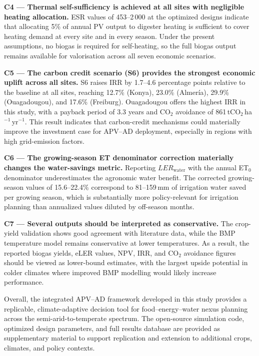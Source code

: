 \textbf{C4 --- Thermal self-sufficiency is achieved at all sites with negligible heating allocation.}
ESR values of 453--2\,000 at the optimized designs indicate that allocating 5\% of annual PV output to digester heating is sufficient to cover heating demand at every site and in every season. Under the present assumptions, no biogas is required for self-heating, so the full biogas output remains available for valorisation across all seven economic scenarios.

\textbf{C5 --- The carbon credit scenario (S6) provides the strongest economic uplift across all sites.}
S6 raises IRR by 1.7--4.6 percentage points relative to the baseline at all sites, reaching 12.7\% (Konya), 23.0\% (Almería), 29.9\% (Ouagadougou), and 17.6\% (Freiburg). Ouagadougou offers the highest IRR in this study, with a payback period of 3.3 years and CO$_2$ avoidance of 861\,tCO$_2$\,ha$^{-1}$\,yr$^{-1}$. This result indicates that carbon-credit mechanisms could materially improve the investment case for APV--AD deployment, especially in regions with high grid-emission factors.

\textbf{C6 --- The growing-season ET denominator correction materially changes the water-savings metric.}
Reporting $LER_{\text{water}}$ with the annual ET$_0$ denominator underestimates the agronomic water benefit. The corrected growing-season values of 15.6--22.4\% correspond to 81--159\,mm of irrigation water saved per growing season, which is substantially more policy-relevant for irrigation planning than annualized values diluted by off-season months.

\textbf{C7 --- Several outputs should be interpreted as conservative.}
The crop-yield validation shows good agreement with literature data, while the BMP temperature model remains conservative at lower temperatures. As a result, the reported biogas yields, eLER values, NPV, IRR, and CO$_2$ avoidance figures should be viewed as lower-bound estimates, with the largest upside potential in colder climates where improved BMP modelling would likely increase performance.

\bigskip
\noindent Overall, the integrated APV--AD framework developed in this study provides a replicable, climate-adaptive decision tool for food--energy--water nexus planning across the semi-arid-to-temperate spectrum. The open-source simulation code, optimized design parameters, and full results database are provided as supplementary material to support replication and extension to additional crops, climates, and policy contexts.